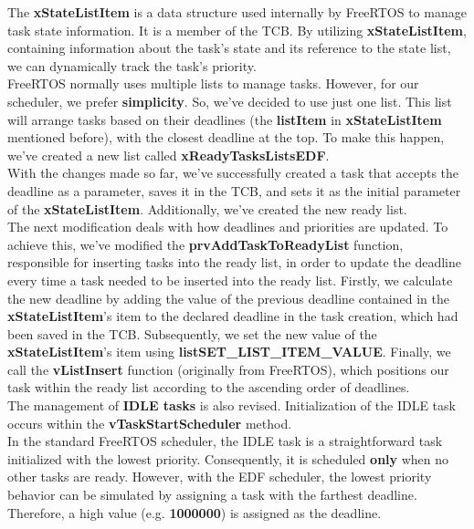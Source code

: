 \documentclass{article}
\begin{document}
\noindent%
The \textbf{xStateListItem} is a data structure used internally by FreeRTOS to manage task state information. It is a member of the TCB. By utilizing \textbf{xStateListItem}, containing information about the task's state and its reference to the state list, we can dynamically track the task's priority.\\[0.1cm]
FreeRTOS normally uses multiple lists to manage tasks. However, for our scheduler, we prefer \textbf{simplicity}. So, we've decided to use just one list. This list will arrange tasks based on their deadlines (the \textbf{listItem} in \textbf{xStateListItem} mentioned before), with the closest deadline at the top. To make this happen, we've created a new list called \textbf{xReadyTasksListsEDF}.\\[0.1cm]%
With the changes made so far, we've successfully created a task that accepts the deadline as a parameter, saves it in the TCB, and sets it as the initial parameter of the \textbf{xStateListItem}. Additionally, we've created the new ready list.\\[0.1cm]
The next modification deals with how deadlines and priorities are updated. To achieve this, we've modified the \textbf{prvAddTaskToReadyList} function, responsible for inserting tasks into the ready list, in order to update the deadline every time a task needed to be inserted into the ready list. Firstly, we calculate the new deadline by adding the value of the previous deadline contained in the \textbf{xStateListItem}'s item to the declared deadline in the task creation, which had been saved in the TCB.\noindent
Subsequently, we set the new value of the \textbf{xStateListItem}'s item using \textbf{listSET\_LIST\_ITEM\_VALUE}. Finally, we call the \textbf{vListInsert} function (originally from FreeRTOS), which positions our task within the ready list according to the ascending order of deadlines.\\[0.1cm]
The management of \textbf{IDLE tasks} is also revised. Initialization of the IDLE task occurs within the \textbf{vTaskStartScheduler} method.\\[0.1cm]
In the standard FreeRTOS scheduler, the IDLE task is a straightforward task initialized with the lowest priority. Consequently, it is scheduled \textbf{only} when no other tasks are ready. However, with the EDF scheduler, the lowest priority behavior can be simulated by assigning a task with the farthest deadline. Therefore, a high value (e.g. \textbf{1000000}) is assigned as the deadline.\\[0.1cm]
\end{document}

